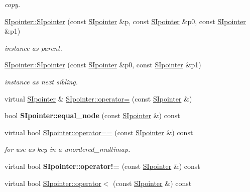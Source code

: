 \begin{DoxyCompactItemize}
\begin{DoxyCompactList}\small\item\em copy. \end{DoxyCompactList}\item 
\mbox{\hyperlink{group__table_ga175406f6e30433d90a004aa27c401f29}{S\+Ipointer\+::\+S\+Ipointer}} (const \mbox{\hyperlink{classSIpointer}{S\+Ipointer}} \&p, const \mbox{\hyperlink{classSIpointer}{S\+Ipointer}} \&p0, const \mbox{\hyperlink{classSIpointer}{S\+Ipointer}} \&p1)
\begin{DoxyCompactList}\small\item\em instance as parent. \end{DoxyCompactList}\item 
\mbox{\hyperlink{group__table_ga19a6965aca9363f90f45c5d0e07bc99e}{S\+Ipointer\+::\+S\+Ipointer}} (const \mbox{\hyperlink{classSIpointer}{S\+Ipointer}} \&p0, const \mbox{\hyperlink{classSIpointer}{S\+Ipointer}} \&p1)
\begin{DoxyCompactList}\small\item\em instance as next sibling. \end{DoxyCompactList}\item 
virtual \mbox{\hyperlink{classSIpointer}{S\+Ipointer}} \& \mbox{\hyperlink{group__table_ga071bb69977a62e26f9ec11230ae2646b}{S\+Ipointer\+::operator=}} (const \mbox{\hyperlink{classSIpointer}{S\+Ipointer}} \&)
\item 
\mbox{\label{group__table_gacc34f81b5d73c93840bce279ddde4620}} 
bool {\bfseries S\+Ipointer\+::equal\+\_\+node} (const \mbox{\hyperlink{classSIpointer}{S\+Ipointer}} \&) const
\item 
virtual bool \mbox{\hyperlink{group__table_ga3330f8e59b08797b4c73ae558f6d588e}{S\+Ipointer\+::operator==}} (const \mbox{\hyperlink{classSIpointer}{S\+Ipointer}} \&) const
\begin{DoxyCompactList}\small\item\em for use as key in a unordered\+\_\+multimap. \end{DoxyCompactList}\item 
\mbox{\label{group__table_ga303c4da57a70fa07b7a2de3692fc9091}} 
virtual bool {\bfseries S\+Ipointer\+::operator!=} (const \mbox{\hyperlink{classSIpointer}{S\+Ipointer}} \&) const
\item 
virtual bool \mbox{\hyperlink{group__table_ga51c64ecf271622a259840f55236778ef}{S\+Ipointer\+::operator$<$}} (const \mbox{\hyperlink{classSIpointer}{S\+Ipointer}} \&) const

\end{DoxyCompactItemize}
